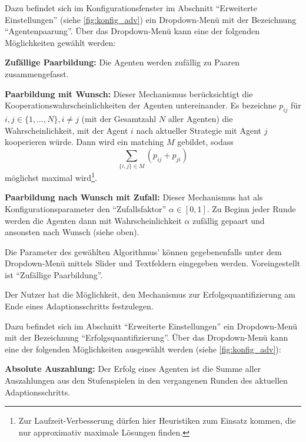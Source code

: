 \documentclass[parskip=full,11pt]{scrartcl}
\def\adapt{Adaptionsschritt}
\begin{document}
Dazu befindet sich im Konfigurationsfenster im Abschnitt \enquote{Erweiterte Einstellungen} (siehe \cref{fig:konfig_adv}) ein Dropdown-Menü mit der Bezeichnung \enquote{Agentenpaarung}. Über das Dropdown-Menü kann eine der folgenden Möglichkeiten gewählt werden:

\textbf{Zufällige Paarbildung:}
Die Agenten werden zufällig zu Paaren zusammengefasst.

\textbf{Paarbildung mit Wunsch:}
Dieser Mechanismus berücksichtigt die Kooperationswahrscheinlichkeiten der Agenten untereinander. Es bezeichne \(p_{ij}\) für \(i,j \in \{1,...,N\}, i \neq j\) (mit der Gesamtzahl \(N\) aller Agenten) die Wahrscheinlichkeit, mit der Agent \(i\) nach aktueller \Gls{Strategie} mit Agent \(j\) kooperieren würde. Dann wird ein \Gls{matching} \(M\) gebildet, sodass
\[
\sum_{\{i,j\} \in M} \left(p_{ij} + p_{ji}\right)
\]
möglichst maximal wird\footnote{Zur Laufzeit-Verbesserung dürfen hier Heuristiken zum Einsatz kommen, die nur approximativ maximale Lösungen finden.}.

\textbf{Paarbildung nach Wunsch mit Zufall:}
Dieser Mechanismus hat als Konfigurationsparameter den \enquote{Zufallsfaktor} \(\alpha \in [0,1]\). Zu Beginn jeder Runde werden die Agenten dann mit Wahrscheinlichkeit \(\alpha\) zufällig gepaart und ansonsten nach Wunsch (siehe oben).

Die Parameter des gewählten Algorithmus' können gegebenenfalls unter dem Dropdown-Menü mittels Slider und Textfeldern eingegeben werden. Voreingestellt ist \enquote{Zufällige Paarbildung}.

Der \Gls{Nutzer} hat die Möglichkeit, den Mechanismus zur Erfolgsquantifizierung am Ende eines \adapt s festzulegen.

Dazu befindet sich im Abschnitt \enquote{Erweiterte Einstellungen} ein Dropdown-Menü mit der Bezeichnung \enquote{Erfolgsquantifizierung}. Über das Dropdown-Menü kann eine der folgenden Möglichkeiten ausgewählt werden (siehe \cref{fig:konfig_adv}):

\textbf{Absolute Auszahlung:}
Der \Gls{Erfolg} eines Agenten ist die Summe aller Auszahlungen aus den \Gls{Stufenspiel}en in den vergangenen Runden des aktuellen \adapt s.
\end{document}
